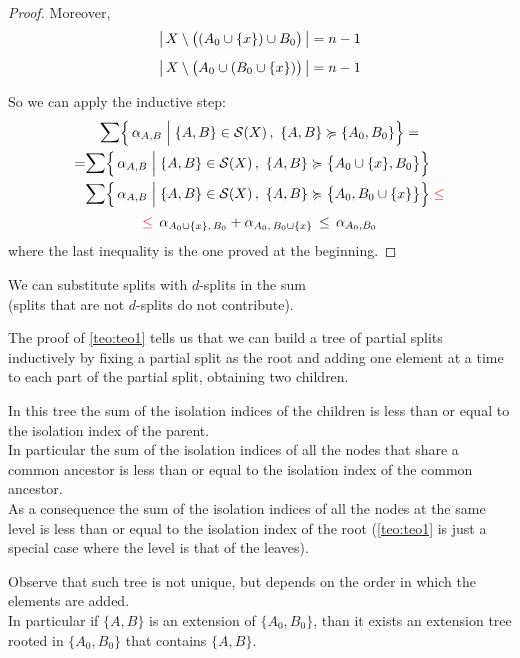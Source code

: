 \documentclass[./main.tex]{subfiles}
\begin{document}
\begin{proof}
    Moreover, \vspace{-5pt}
    \begin{align*}
        \left\lvert\, X \setminus \bigl( (A_0 \cup \{x\}) \cup B_0 \bigr) \,\right\rvert &= n-1 \\[5pt]
        \left\lvert\, X \setminus \bigl( A_0 \cup (B_0 \cup \{x\}) \bigr) \,\right\rvert &= n-1
    \end{align*}

    So we can apply the inductive step:
    \begin{gather*}
        \mathlarger{\sum} \Bigl\{\, \aAB \mathrel{\Big|} \{A,B\} \in \Sc(X) \,,\ \{A,B\} \succcurlyeq \{A_0,B_0\} \Bigr\} = \\
        \begin{split}
            = &\mathlarger{\sum} \Bigl\{\, \aAB \mathrel{\Big|} \{A,B\} \in \Sc(X) \,,\ \{A,B\} \succcurlyeq \bigl\{ A_0 \cup \{x\}, B_0 \bigr\} \Bigr\} \\
            &\mathlarger{\sum} \Bigl\{\, \aAB \mathrel{\Big|} \{A,B\} \in \Sc(X) \,,\ \{A,B\} \succcurlyeq \bigl\{ A_0, B_0 \cup \{x\} \bigr\} \Bigr\} \mathcolor{red}{\leq}
        \end{split} \\
        \mathcolor{red}{\leq}\, \alpha_{A_0 \cup \{x\},\, B_0} + \alpha_{A_0,\, B_0 \cup \{x\}} \,\leq\, \alpha_{A_0,B_0}
    \end{gather*}
    where the last inequality is the one proved at the beginning.
\end{proof}

\begin{remark}
    We can substitute splits with $d$-splits in the sum \\
    \bsp (splits that are not $d$-splits do not contribute).
\end{remark}

\begin{remark}
    The proof of \autoref{teo:teo1} tells us that we can build a tree of partial splits inductively by fixing a partial split as the root and adding one element at a time to each part of the partial split, obtaining two children.
    
    In this tree the sum of the isolation indices of the children is less than or equal to the isolation index of the parent. \\[2pt]
    In particular the sum of the isolation indices of all the nodes that share a common ancestor is less than or equal to the isolation index of the common ancestor. \\[2pt]
    As a consequence the sum of the isolation indices of all the nodes at the same level is less than or equal to the isolation index of the root (\autoref{teo:teo1} is just a special case where the level is that of the leaves).

    Observe that such tree is not unique, but depends on the order in which the elements are added. \\
    In particular if $\{A,B\}$ is an extension of $\{A_0,B_0\}$, than it exists an extension tree rooted in $\{A_0,B_0\}$ that contains $\{A,B\}$.
\end{remark}
\end{document}
